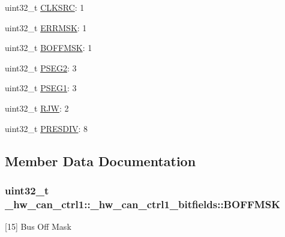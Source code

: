 \begin{DoxyCompactItemize}
\item 
uint32\+\_\+t \hyperlink{struct__hw__can__ctrl1_1_1__hw__can__ctrl1__bitfields_aecdd0cca5ce09e3683ea7242d6024b4a}{C\+L\+K\+S\+RC}\+: 1
\item 
uint32\+\_\+t \hyperlink{struct__hw__can__ctrl1_1_1__hw__can__ctrl1__bitfields_ad38b78c4211157ff12e8451b693f1a3c}{E\+R\+R\+M\+SK}\+: 1
\item 
uint32\+\_\+t \hyperlink{struct__hw__can__ctrl1_1_1__hw__can__ctrl1__bitfields_a687799fb4c042f75c22fbf102888f7c9}{B\+O\+F\+F\+M\+SK}\+: 1
\item 
uint32\+\_\+t \hyperlink{struct__hw__can__ctrl1_1_1__hw__can__ctrl1__bitfields_a8310bdd8b668ce697221e4b7e33b8bb4}{P\+S\+E\+G2}\+: 3
\item 
uint32\+\_\+t \hyperlink{struct__hw__can__ctrl1_1_1__hw__can__ctrl1__bitfields_a28c202e19611c190d4739314590d3019}{P\+S\+E\+G1}\+: 3
\item 
uint32\+\_\+t \hyperlink{struct__hw__can__ctrl1_1_1__hw__can__ctrl1__bitfields_a303a79ba260e105d0d68d49ccb5a97ea}{R\+JW}\+: 2
\item 
uint32\+\_\+t \hyperlink{struct__hw__can__ctrl1_1_1__hw__can__ctrl1__bitfields_a388d169c12a61de22164f106c51198ec}{P\+R\+E\+S\+D\+IV}\+: 8
\end{DoxyCompactItemize}


\subsection{Member Data Documentation}
\subsubsection[{\texorpdfstring{B\+O\+F\+F\+M\+SK}{BOFFMSK}}]{\setlength{\rightskip}{0pt plus 5cm}uint32\+\_\+t \+\_\+hw\+\_\+can\+\_\+ctrl1\+::\+\_\+hw\+\_\+can\+\_\+ctrl1\+\_\+bitfields\+::\+B\+O\+F\+F\+M\+SK}\hypertarget{struct__hw__can__ctrl1_1_1__hw__can__ctrl1__bitfields_a687799fb4c042f75c22fbf102888f7c9}{}\label{struct__hw__can__ctrl1_1_1__hw__can__ctrl1__bitfields_a687799fb4c042f75c22fbf102888f7c9}
\mbox{[}15\mbox{]} Bus Off Mask 
